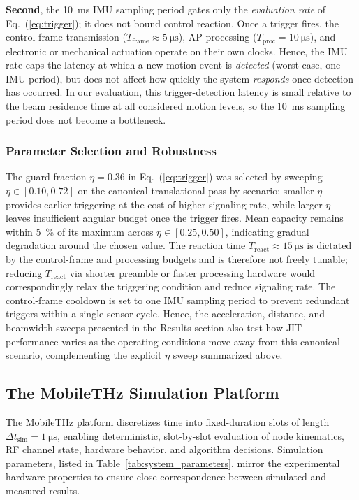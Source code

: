 \documentclass[fleqn,10pt]{wlscirep}
\newcommand{\rev}[1]{{\color{revblue}#1}}
\begin{document}
{\textbf{Second}, the \SI{10}{\milli\second} IMU sampling period gates only the \emph{evaluation rate} of Eq.~(\ref{eq:trigger}); it does not bound control reaction. Once a trigger fires, the control-frame transmission ($T_{\text{frame}} \approx \SI{5}{\micro\second}$), AP processing ($T_{\text{proc}} = \SI{10}{\micro\second}$), and electronic or mechanical actuation operate on their own clocks. Hence, the IMU rate caps the latency at which a new motion event is \emph{detected} (worst case, one IMU period), but does not affect how quickly the system \emph{responds} once detection has occurred. In our evaluation, this trigger-detection latency is small relative to the beam residence time at all considered motion levels, so the \SI{10}{\milli\second} sampling period does not become a bottleneck.}

\rev{\subsubsection*{Parameter Selection and Robustness}
The guard fraction $\eta = 0.36$ in Eq.~(\ref{eq:trigger}) was selected by sweeping $\eta \in [0.10, 0.72]$ on the canonical translational pass-by scenario: smaller $\eta$ provides earlier triggering at the cost of higher signaling rate, while larger $\eta$ leaves insufficient angular budget once the trigger fires. Mean capacity remains within \SI{5}{\percent} of its maximum across $\eta \in [0.25, 0.50]$, indicating gradual degradation around the chosen value. The reaction time $T_{\text{react}} \approx \SI{15}{\micro\second}$ is dictated by the control-frame and processing budgets and is therefore not freely tunable; reducing $T_{\text{react}}$ via shorter preamble or faster processing hardware would correspondingly relax the triggering condition and reduce signaling rate. The control-frame cooldown is set to one IMU sampling period to prevent redundant triggers within a single sensor cycle. Hence, the acceleration, distance, and beamwidth sweeps presented in the Results section also test how JIT performance varies as the operating conditions move away from this canonical scenario, complementing the explicit $\eta$ sweep summarized above.}



\subsection*{The MobileTHz Simulation Platform}
The MobileTHz platform discretizes time into fixed-duration slots of length $\Delta t_{\text{sim}} = \SI{1}{\micro\second}$, enabling deterministic, slot-by-slot evaluation of node kinematics, RF channel state, hardware behavior, and algorithm decisions. Simulation parameters, listed in Table~\ref{tab:system_parameters}, mirror the experimental hardware properties to ensure close correspondence between simulated and measured results.
\end{document}
